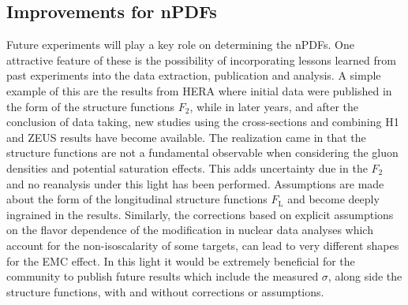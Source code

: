 


\subsection{Improvements for nPDFs}

Future experiments will play a key role on determining the nPDFs. One attractive feature of these is the possibility of incorporating lessons learned from past experiments into the data extraction, publication and analysis. A simple example of this are the results from HERA where initial data were published in the form of the structure functions $F_{2}$, while in later years, and after the conclusion of data taking, new studies using the cross-sections and combining H1 and ZEUS results have become available. The realization came in that the structure functions are not a fundamental observable when considering the gluon densities and potential saturation effects. This adds uncertainty due in the $F_{2}$ and no reanalysis under this light has been performed.  Assumptions are made about the form of the longitudinal structure functions $F_\mathrm{L}$ and become deeply ingrained in the results.  Similarly, the corrections based on explicit assumptions on the flavor dependence of the modification in nuclear data analyses which account for the non-isoscalarity of some targets, can lead to very different shapes for the EMC effect.  In this light it would be extremely beneficial for the community to publish future results which include  the measured $\sigma$, along side the structure functions, with and without corrections or assumptions. 

